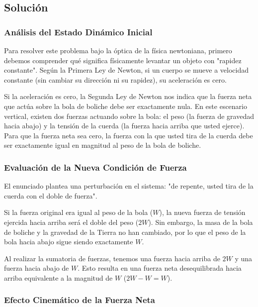 \documentclass[12pt, a4paper]{article}
\begin{document}
\subsection*{Solución}

\subsubsection*{Análisis del Estado Dinámico Inicial}

Para resolver este problema bajo la óptica de la física newtoniana, primero debemos comprender qué significa físicamente levantar un objeto con "rapidez constante". Según la Primera Ley de Newton, si un cuerpo se mueve a velocidad constante (sin cambiar su dirección ni su rapidez), su aceleración es cero. 

Si la aceleración es cero, la Segunda Ley de Newton nos indica que la fuerza neta que actúa sobre la bola de boliche debe ser exactamente nula. En este escenario vertical, existen dos fuerzas actuando sobre la bola: el peso (la fuerza de gravedad hacia abajo) y la tensión de la cuerda (la fuerza hacia arriba que usted ejerce). Para que la fuerza neta sea cero, la fuerza con la que usted tira de la cuerda debe ser exactamente igual en magnitud al peso de la bola de boliche.

\subsubsection*{Evaluación de la Nueva Condición de Fuerza}

El enunciado plantea una perturbación en el sistema: "de repente, usted tira de la cuerda con el doble de fuerza". 

Si la fuerza original era igual al peso de la bola ($W$), la nueva fuerza de tensión ejercida hacia arriba será el doble del peso ($2W$). Sin embargo, la masa de la bola de boliche y la gravedad de la Tierra no han cambiado, por lo que el peso de la bola hacia abajo sigue siendo exactamente $W$.

Al realizar la sumatoria de fuerzas, tenemos una fuerza hacia arriba de $2W$ y una fuerza hacia abajo de $W$. Esto resulta en una fuerza neta desequilibrada hacia arriba equivalente a la magnitud de $W$ ($2W - W = W$).

\subsubsection*{Efecto Cinemático de la Fuerza Neta}
\end{document}
